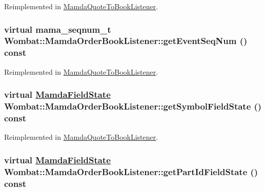 Reimplemented in \hyperlink{classMamdaQuoteToBookListener_ff147fdfb64bad58dc439addc0eea46b}{Mamda\-Quote\-To\-Book\-Listener}.\hypertarget{classWombat_1_1MamdaOrderBookListener_be0061292ee9bd7ef1d890bd825b1a0d}{
\subsubsection[getEventSeqNum]{\setlength{\rightskip}{0pt plus 5cm}virtual mama\_\-seqnum\_\-t Wombat::Mamda\-Order\-Book\-Listener::get\-Event\-Seq\-Num () const}}
\label{classWombat_1_1MamdaOrderBookListener_be0061292ee9bd7ef1d890bd825b1a0d}




Reimplemented in \hyperlink{classMamdaQuoteToBookListener_ad266e6ce78c83599aa9b0c380f2b5e0}{Mamda\-Quote\-To\-Book\-Listener}.\hypertarget{classWombat_1_1MamdaOrderBookListener_ed48775d67d2806a1d78fbf5310f7a5b}{
\subsubsection[getSymbolFieldState]{\setlength{\rightskip}{0pt plus 5cm}virtual \hyperlink{namespaceWombat_93aac974f2ab713554fd12a1fa3b7d2a}{Mamda\-Field\-State} Wombat::Mamda\-Order\-Book\-Listener::get\-Symbol\-Field\-State () const}}
\label{classWombat_1_1MamdaOrderBookListener_ed48775d67d2806a1d78fbf5310f7a5b}




Reimplemented in \hyperlink{classMamdaQuoteToBookListener_6be1e25a1f340cf0142816c7cdb3d593}{Mamda\-Quote\-To\-Book\-Listener}.\hypertarget{classWombat_1_1MamdaOrderBookListener_0ebeb44c9a22a8d459b075f0afcd0f69}{
\subsubsection[getPartIdFieldState]{\setlength{\rightskip}{0pt plus 5cm}virtual \hyperlink{namespaceWombat_93aac974f2ab713554fd12a1fa3b7d2a}{Mamda\-Field\-State} Wombat::Mamda\-Order\-Book\-Listener::get\-Part\-Id\-Field\-State () const}}
\label{classWombat_1_1MamdaOrderBookListener_0ebeb44c9a22a8d459b075f0afcd0f69}




